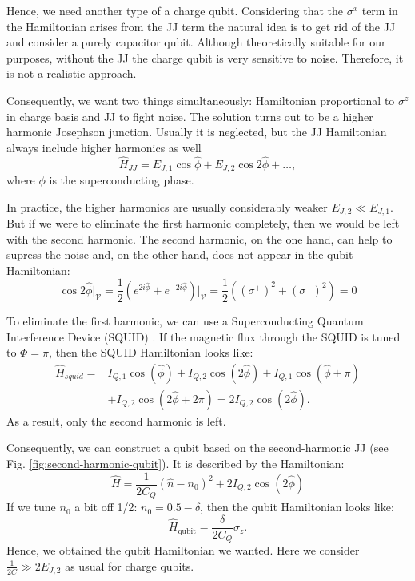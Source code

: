 \documentclass[reprint, aps, prx, amsmath, amssymb, longbibliography, superscriptaddress]{revtex4-2}
\begin{document}
Hence, we need another type of a charge qubit. Considering that the $\sigma^x$ term in the Hamiltonian arises from the JJ term the natural idea is to get rid of the JJ and consider a purely capacitor qubit. Although theoretically suitable for our purposes, without the JJ the charge qubit is very sensitive to noise. Therefore, it is not a realistic approach.

Consequently, we want two things simultaneously: Hamiltonian proportional to $\sigma^z$ in charge basis and JJ to fight noise. The solution turns out to be a higher harmonic Josephson junction. Usually it is neglected, but the JJ Hamiltonian always include higher harmonics as well
\begin{equation}
    \hat H_{JJ} = E_{J,1} \cos{\hat \phi} + E_{J,2} \cos{2\hat \phi} + \dots,
\end{equation}
where $\phi$ is the superconducting phase.

In practice, the higher harmonics are usually considerably weaker $E_{J,2} \ll E_{J,1}$. But if we were to eliminate the first harmonic completely, then we would be left with the second harmonic. The second harmonic, on the one hand, can help to supress the noise and, on the other hand, does not appear in the qubit Hamiltonian:
\begin{equation}
    \cos{2\hat \phi}\bigg|_{\mathcal{V}} = \frac{1}{2}\left(e^{2i\hat\phi} + e^{-2i\hat \phi}\right)\bigg|_{\mathcal{V}}=\frac{1}{2}\left((\sigma^+)^2 + (\sigma^-)^2\right) =0
\end{equation}

To eliminate the first harmonic, we can use a Superconducting Quantum Interference Device (SQUID) \cite{valentini_parityconserving_2024}. If the magnetic flux through the SQUID is tuned to $\Phi = \pi$, then the SQUID Hamiltonian looks like:
\begin{equation}
\begin{aligned}
    \hat H_{squid} = &I_{Q,1} \cos(\hat \phi) + I_{Q,2} \cos(2\hat \phi) + I_{Q,1} \cos(\hat \phi + \pi) \\
    &+ I_{Q,2} \cos(2\hat \phi + 2\pi) = 2 I_{Q,2} \cos(2\hat \phi).
\end{aligned}
\end{equation}
As a result, only the second harmonic is left.

Consequently, we can construct a qubit based on the second-harmonic JJ (see Fig. \ref{fig:second-harmonic-qubit}). It is described by the Hamiltonian:
\begin{equation}
\label{second-harmonic-qubit}
    \hat H = \frac{1}{2C_Q} (\hat n - n_0)^2 + 2 I_{Q,2} \cos(2\hat\phi)
\end{equation}
If we tune $n_0$ a bit off 1/2: $n_0 = 0.5 - \delta$, then the qubit Hamiltonian looks like:
\begin{equation}
    \hat H_{\text{qubit}} = \frac{\delta}{2 C_Q} \sigma_z.
\end{equation}
Hence, we obtained the qubit Hamiltonian we wanted. Here we consider $\frac{1}{2C} \gg 2 E_{J,2}$ as usual for charge qubits.
\end{document}
